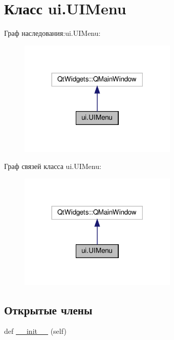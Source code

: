 \hypertarget{classui_1_1_u_i_menu}{}\section{Класс ui.\+U\+I\+Menu}
\label{classui_1_1_u_i_menu}


Граф наследования\+:ui.\+U\+I\+Menu\+:\nopagebreak
\begin{figure}[H]
\begin{center}
\leavevmode
\includegraphics[width=213pt]{classui_1_1_u_i_menu__inherit__graph}
\end{center}
\end{figure}


Граф связей класса ui.\+U\+I\+Menu\+:\nopagebreak
\begin{figure}[H]
\begin{center}
\leavevmode
\includegraphics[width=213pt]{classui_1_1_u_i_menu__coll__graph}
\end{center}
\end{figure}
\subsection*{Открытые члены}
\begin{DoxyCompactItemize}
\item 
def \hyperlink{classui_1_1_u_i_menu_ad0be15df979e3d015a770bd08f3da88b}{\+\_\+\+\_\+init\+\_\+\+\_\+} (self)
\end{DoxyCompactItemize}


